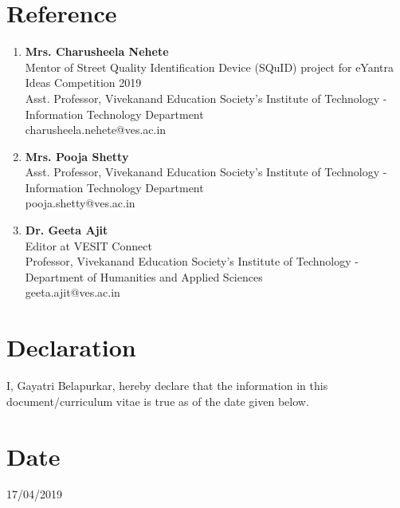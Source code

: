 \documentclass[margin]{res}
\begin{document}
\begin{resume}
\section{Reference}
\begin{enumerate}
  \item {\bf Mrs. Charusheela Nehete}\\Mentor of Street Quality Identification Device (SQuID) project for eYantra Ideas Competition 2019\\  Asst. Professor, Vivekanand Education Society's Institute of Technology - Information Technology Department \\ charusheela.nehete@ves.ac.in
  \item {\bf Mrs. Pooja Shetty}\\ Asst. Professor, Vivekanand Education Society's Institute of Technology - Information Technology Department \\ pooja.shetty@ves.ac.in
  \item {\bf Dr. Geeta Ajit} \\ Editor at VESIT Connect \\ Professor, Vivekanand Education Society's Institute of Technology - Department of Humanities and Applied Sciences \\ geeta.ajit@ves.ac.in
\end{enumerate}

\section{Declaration}
I, Gayatri Belapurkar, hereby declare that the information in this document/curriculum vitae is true as of the date given below. 

\section{Date}
17/04/2019

\end{resume}
\end{document}
